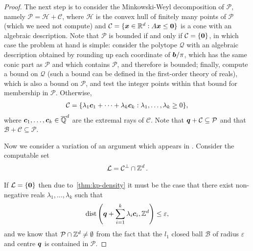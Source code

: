 \begin{proof}
The next step is to consider the Minkowski-Weyl decomposition of $\mathcal{P}$, namely $\mathcal{P} = \mathcal{H} + \mathcal{C}$, where $\mathcal{H}$ is the convex hull of finitely many points of $\mathcal{P}$ (which we need not compute) and $\mathcal{C} = \lbrace \boldsymbol{x} \in \mathbb{R}^{d}: A \boldsymbol{x} \leq \boldsymbol{0} \rbrace$ is a cone with an algebraic description. Note that $\mathcal{P}$ is bounded if and only if $\mathcal{C} = \lbrace \boldsymbol{0} \rbrace$, in which case the problem at hand is simple: consider the polytope $\mathcal{Q}$ with an algebraic description obtained by rounding up each coordinate of $\boldsymbol{b} / \pi$, which has the same conic part as $\mathcal{P}$ and which contains $\mathcal{P}$, and therefore is bounded; finally, compute a bound on $\mathcal{Q}$ (such a bound can be defined in the first-order theory of reals), which is also a bound on $\mathcal{P}$, and test the integer points within that bound for membership in $\mathcal{P}$. Otherwise,
\begin{align*}
\mathcal{C} = \lbrace \lambda_{1} \boldsymbol{c}_{1} + \cdots + \lambda_{k} \boldsymbol{c}_{k}: \lambda_{1}, \ldots, \lambda_{k} \geq 0 \rbrace,
\end{align*}
where $\boldsymbol{c}_{1}, \ldots, \boldsymbol{c}_{k} \in \overline{\mathbb{Q}}^{d}$ are the extremal rays of $\mathcal{C}$. Note that $\boldsymbol{q} + \mathcal{C} \subseteq \mathcal{P}$ and that $\mathcal{B} + \mathcal{C} \subseteq \mathcal{P}$.

Now we consider a variation of an argument which appears in \cite{KhachiyanP97}. Consider the computable set
\begin{align*}
{\cal{L}} = \mathcal{C}^{\perp} \cap \mathbb{Z}^{d} \, .
\end{align*}

If ${\cal{L}} = \lbrace \boldsymbol{0} \rbrace$ then due to~\cref{thm:kp-density} it must be the case that there exist non-negative reals $\lambda_{1}, \ldots, \lambda_{k}$ such that
\begin{align*}
\operatorname{dist} \left(\boldsymbol{q} + \sum\limits_{i=1}^{k} \lambda_{i} \boldsymbol{c}_{i}, \mathbb{Z}^{d} \right) \leq \varepsilon ,
\end{align*}
and we know that $\mathcal{P} \cap \mathbb{Z}^{d} \neq \emptyset$ from the fact that the $l_{1}$ closed ball $\mathcal{B}$ of radius $\varepsilon$ and centre $\boldsymbol{q}$ is contained in $\mathcal{P}$.


\end{proof}
